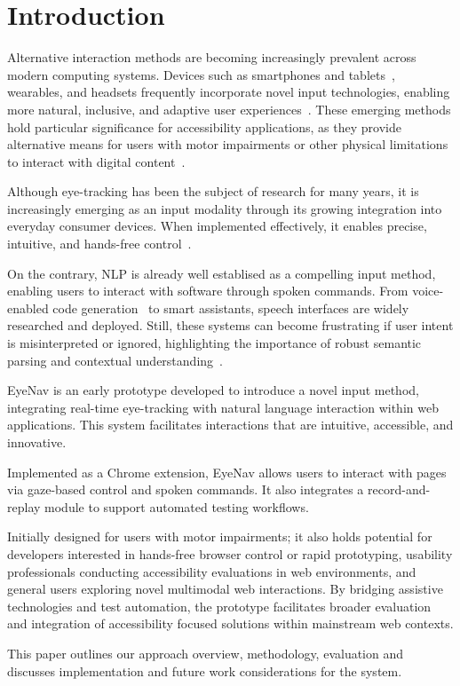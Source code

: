 
\section{Introduction}

Alternative interaction methods are becoming increasingly prevalent across modern computing systems. 
Devices such as smartphones and tablets~\cite{apple2024accessibility, honor_magic6pro_specs}, wearables\cite{tobii_glasses_x}, and headsets\cite{apple_vision_pro_2025,playstation_vr2_specs,vive_pro2_2025} frequently incorporate novel input technologies, enabling more natural, inclusive, and adaptive user experiences~\cite{dondi2023gazehci, fernandes2023eyevr}.
These emerging methods hold particular significance for accessibility applications, as they provide alternative means for users with motor impairments or other physical limitations to interact with digital content~\cite{hsieh2024increasing}.

Although eye-tracking has been the subject of research for many years\cite{gips1996eagleeyes}, it is increasingly emerging as an input modality through its growing integration into everyday consumer devices. When implemented effectively, it enables precise, intuitive, and hands-free control~\cite{huang2024visionpro}.

On the contrary, \ac{NLP} is already well establised as a compelling input method, enabling users to interact with software through spoken commands. 
From voice-enabled code generation~\cite{serenade2025} to smart assistants, speech interfaces are widely researched and deployed. Still, these systems can become frustrating if user intent is misinterpreted or ignored, highlighting the importance of robust semantic parsing and contextual understanding~\cite{mozafari2020chatbot, liu2024chatgpt}. 

EyeNav is an early prototype developed to introduce a novel input method, integrating real-time eye-tracking with natural language interaction within web applications. This system facilitates interactions that are intuitive, accessible, and innovative.

Implemented as a Chrome extension, EyeNav allows users to interact with pages via gaze-based control and spoken commands. It also integrates a record-and-replay module to support automated testing workflows.

Initially designed for users with motor impairments; it also holds potential for developers interested in hands-free browser control or rapid prototyping, usability professionals conducting accessibility evaluations in web environments, and general users exploring novel multimodal web interactions. By bridging assistive technologies and test automation, the prototype facilitates broader evaluation and integration of accessibility focused solutions within mainstream web contexts.

This paper outlines our approach overview, methodology, evaluation and discusses implementation and future work considerations for the system.
